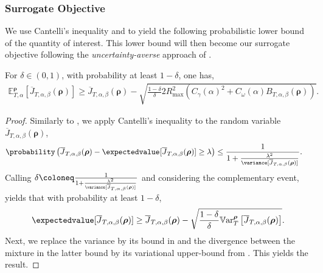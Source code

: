 \subsubsection{Surrogate Objective}
\label{subsec:surrogate_objective}

We use Cantelli's inequality and  to yield the following probabilistic lower bound of the quantity of interest. This lower bound will then become our surrogate objective following the \emph{uncertainty-averse} approach of \cite{metelli2018policy}.

\begin{thm}
\label{th:bound_surrogate_objective}
    For $\delta\in (0,1)$, with probability at least $1-\delta$, one has,
\begin{align*}
    \mathbb{E}_{T,\alpha}^{\boldsymbol\rho}\left[\overline{J}_{T,\alpha,\beta}(\boldsymbol\rho) \right] 
    \geq 
    \overline{J}_{T,\alpha,\beta}(\boldsymbol\rho)  - \sqrt{\frac{1-\delta}{\delta} 2R_{\max}^2 \left( C_\gamma(\alpha)^2 + C_\omega(\alpha) {B}_{T,\alpha,\beta}(\boldsymbol\rho)\right)}.
\end{align*}
\end{thm}
\begin{proof}
    Similarly to \cite{metelli2018policy}, we apply Cantelli's inequality to the random variable $\overline{J}_{T,\alpha,\beta}(\boldsymbol\rho)$,
    \begin{align*}
        \probability\left( \overline{J}_{T,\alpha,\beta}(\boldsymbol\rho) - \expectedvalue[\overline{J}_{T,\alpha,\beta}(\boldsymbol\rho)]\geq \lambda\right) &\leq \frac{1}{1+\frac{\lambda^2}{\variance[\overline{J}_{T,\alpha,\beta}(\boldsymbol\rho)]}}.
    \end{align*}  
    Calling $\delta \coloneq \frac{1}{1+\frac{\lambda^2}{\variance[\overline{J}_{T,\alpha,\beta}(\boldsymbol\rho)]}}$ and considering the complementary event, yields that with probability at least $1-\delta$,
    \begin{align*}
        \expectedvalue[\overline{J}_{T,\alpha,\beta}(\boldsymbol\rho)]\geq  \overline{J}_{T,\alpha,\beta}(\boldsymbol\rho) - 
        \sqrt{
            \frac{1-\delta}{\delta}  \mathbb{V}\mathrm{ar}^{\boldsymbol\rho}_T \left[\overline{J}_{T,\alpha,\beta}(\boldsymbol\rho)\right] 
        }.
    \end{align*}
    Next, we replace the variance by its bound in  and the \Renyi divergence between the mixture in the latter bound by its variational upper-bound from .
    This yields the result.
\end{proof}

